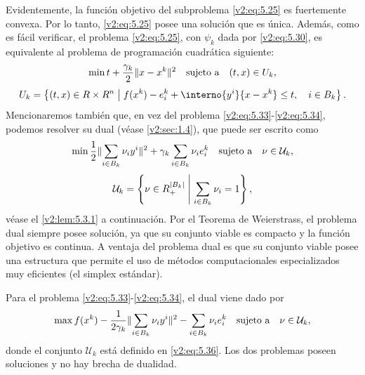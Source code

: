 Evidentemente, la función objetivo del subproblema \eqref{v2:eq:5.25} es fuertemente convexa. Por lo tanto, \eqref{v2:eq:5.25} posee una solución que es única. Además, como es fácil verificar, el problema \eqref{v2:eq:5.25}, con $\psi_k$ dada por \eqref{v2:eq:5.30}, es equivalente al problema de programación cuadrática siguiente:
\begin{equation}
    \min t + \frac{\gamma_k}{2} \lVert x - x^k\rVert^2 \quad \text{sujeto a} \quad (t, x) \in U_k,
    \label{v2:eq:5.33}
\end{equation}
\begin{equation}
    U_k = \left\{ (t, x) \in \R \times \Rn \;\middle|\; f(x^k) - e_i^k + \interno{y^i}{x - x^k} \le t, \quad i \in B_k \right\}.
    \label{v2:eq:5.34}
\end{equation}
Mencionaremos también que, en vez del problema \eqref{v2:eq:5.33}-\eqref{v2:eq:5.34}, podemos resolver su dual (véase \cref{v2:sec:1.4}), que puede ser escrito como
\begin{equation}
    \min \frac{1}{2} \lVert\sum_{i \in B_k} \nu_i y^i\rVert^2 + \gamma_k \sum_{i \in B_k} \nu_i e_i^k \quad \text{sujeto a} \quad \nu \in \mathcal{U}_k,
    \label{v2:eq:5.35}
\end{equation}
\begin{equation}
    \mathcal{U}_k = \left\{ \nu \in R_+^{|B_k|} \;\middle|\; \sum_{i \in B_k} \nu_i = 1 \right\},
    \label{v2:eq:5.36}
\end{equation}
véase el \cref{v2:lem:5.3.1} a continuación. Por el Teorema de Weierstrass, el problema dual siempre posee solución, ya que su conjunto viable es compacto y la función objetivo es continua. A ventaja del problema dual es que su conjunto viable posee una estructura que permite el uso de métodos computacionales especializados muy eficientes (el simplex estándar).

\begin{lemma}\label{v2:lem:5.3.1}
    Para el problema \eqref{v2:eq:5.33}-\eqref{v2:eq:5.34}, el dual viene dado por
    \begin{equation}
        \max f(x^k) - \frac{1}{2\gamma_k} \lVert\sum_{i \in B_k} \nu_i y^i\rVert^2 - \sum_{i \in B_k} \nu_i e_i^k \quad \text{sujeto a} \quad \nu \in \mathcal{U}_k,
        \label{v2:eq:5.37}
    \end{equation}
    donde el conjunto $\mathcal{U}_k$ está definido en \eqref{v2:eq:5.36}. Los dos problemas poseen soluciones y no hay brecha de dualidad.
\end{lemma}


